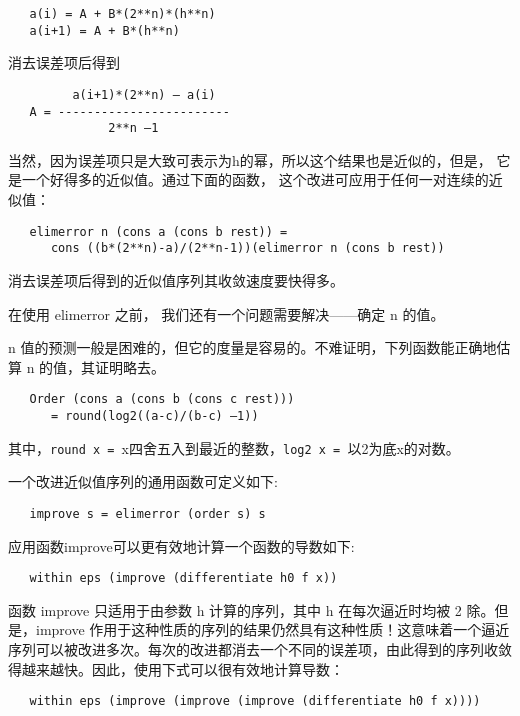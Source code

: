 \documentclass[12pt]{article}
\begin{document}
\begin{verbatim}
   a(i) = A + B*(2**n)*(h**n)
   a(i+1) = A + B*(h**n)
\end{verbatim}

消去误差项后得到

\begin{verbatim}
         a(i+1)*(2**n) – a(i)
   A = ------------------------
              2**n –1
\end{verbatim}

当然，因为误差项只是大致可表示为h的幂，所以这个结果也是近似的，但是， 它是一个好得多的近似值。通过下面的函数， 这个改进可应用于任何一对连续的近似值：

\begin{verbatim}
   elimerror n (cons a (cons b rest)) = 
      cons ((b*(2**n)-a)/(2**n-1))(elimerror n (cons b rest))
\end{verbatim}

消去误差项后得到的近似值序列其收敛速度要快得多。

在使用 elimerror 之前， 我们还有一个问题需要解决——确定 n 的值。

n 值的预测一般是困难的，但它的度量是容易的。不难证明，下列函数能正确地估算 n 的值，其证明略去。

\begin{verbatim}
   Order (cons a (cons b (cons c rest)))
      = round(log2((a-c)/(b-c) –1))
\end{verbatim}

其中，\verb"round x = "x四舍五入到最近的整数，\verb"log2 x = "以2为底x的对数。

一个改进近似值序列的通用函数可定义如下:

\begin{verbatim}
   improve s = elimerror (order s) s
\end{verbatim}

应用函数improve可以更有效地计算一个函数的导数如下:
\begin{verbatim}
   within eps (improve (differentiate h0 f x))
\end{verbatim}

函数 improve 只适用于由参数 h 计算的序列，其中 h 在每次逼近时均被 2 除。但是，improve 作用于这种性质的序列的结果仍然具有这种性质！这意味着一个逼近序列可以被改进多次。每次的改进都消去一个不同的误差项，由此得到的序列收敛得越来越快。因此，使用下式可以很有效地计算导数：

\begin{verbatim}
   within eps (improve (improve (improve (differentiate h0 f x))))
\end{verbatim}
\end{document}
